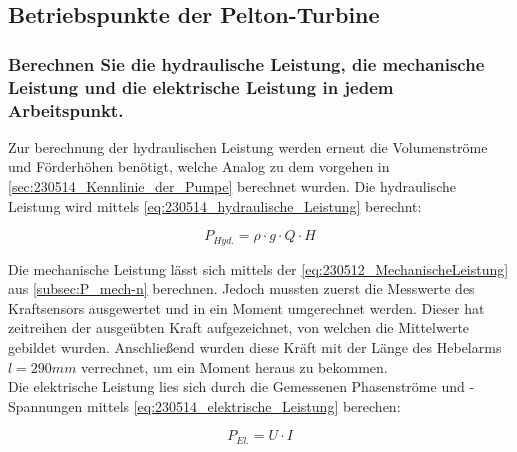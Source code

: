 \subsection{Betriebspunkte der Pelton-Turbine}
\subsubsection{Berechnen Sie die hydraulische Leistung, die mechanische Leistung und die elektrische Leistung in jedem Arbeitspunkt.}
Zur berechnung der hydraulischen Leistung werden erneut die Volumenströme und Förderhöhen benötigt, welche Analog zu dem vorgehen in \autoref{sec:230514_Kennlinie_der_Pumpe} berechnet wurden.
Die hydraulische Leistung wird mittels \autoref{eq:230514_hydraulische_Leistung} berechnt:

\begin{equation}
  P_{Hyd.} = \rho \cdot g \cdot Q \cdot H
  \label{eq:230514_hydraulische_Leistung}
\end{equation}

Die mechanische Leistung lässt sich mittels der \autoref{eq:230512_MechanischeLeistung} aus \autoref{subsec:P_mech-n} berechnen.
Jedoch mussten zuerst die Messwerte des Kraftsensors ausgewertet und in ein Moment umgerechnet werden.
Dieser hat zeitreihen der ausgeübten Kraft aufgezeichnet, von welchen die Mittelwerte gebildet wurden.
Anschließend wurden diese Kräft mit der Länge des Hebelarms $l = 290 mm$ verrechnet, um ein Moment heraus zu bekommen.\\
Die elektrische Leistung lies sich durch die Gemessenen Phasenströme und -Spannungen mittels \autoref{eq:230514_elektrische_Leistung} berechen:

\begin{equation}
  P_{El.} = U \cdot I
  \label{eq:230514_elektrische_Leistung}
\end{equation}


